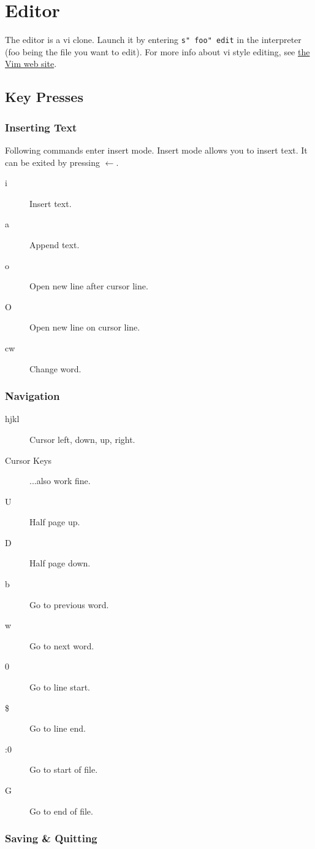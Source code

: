 \chapter{Editor} \label{editor}

The editor is a vi clone. Launch it by entering \texttt{s" foo" edit} in the interpreter (foo being the file you want to edit). For more info about vi style editing, see \href{http://www.vim.org}{the Vim web site}.

\section{Key Presses}

\subsection{Inserting Text}
Following commands enter insert mode. Insert mode allows you to insert text. It can be exited by pressing $\leftarrow$.
\begin{description}
\item[i] Insert text.
\item[a] Append text.
\item[o] Open new line after cursor line.
\item[O] Open new line on cursor line.
\item[cw] Change word.
\end{description}

\subsection{Navigation}
\begin{description}
\item[hjkl] Cursor left, down, up, right.
\item[Cursor Keys] ...also work fine.
\item[U] Half page up.
\item[D] Half page down.
\item[b] Go to previous word.
\item[w] Go to next word.
\item[0] Go to line start.
\item[\$] Go to line end.
\item[:0] Go to start of file.
\item[G] Go to end of file.
\end{description}

\subsection{Saving \& Quitting}

